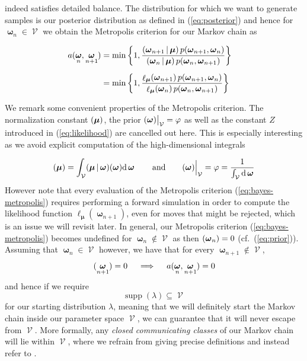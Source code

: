 \documentclass[10pt]{article}
\newcommand{\cf}{cf.~}
\let\Pr\relax
\DeclareMathOperator\Pr{\mathbb{P}}
\DeclareMathOperator\fp{\mathcal{V}}
\DeclareMathOperator\likeli{\ell}
\DeclareMathOperator\supp{\mathrm{supp}}
\DeclareMathOperator\bmu{\boldsymbol{\mu}}
\DeclareMathOperator\bomega{\boldsymbol{\omega}}
\begin{document}
indeed satisfies detailed balance.
The distribution for which we want to generate samples is our posterior distribution as defined in (\ref{eq:posterior}) 
and hence for $\bomega_n \in \fp$ we obtain the Metropolis criterion for our Markov chain as
\begin{align}
    \nonumber \\[-12pt] 
    a(\bomega_n,\bomega_{n+1}) 
	&= \min\bigg\{ 1, \frac{ 
	    \Pr(\bomega_{n+1}|\bmu) \, p(\bomega_{n+1}, \bomega_n) 
	}{ 
	    \Pr(\bomega_n|\bmu) \, p(\bomega_n, \bomega_{n+1}) 
	} \bigg\} 
	\nonumber \\[2mm]
	&= \min\bigg\{ 1, \frac{ 
	    \likeli_{\bmu}(\bomega_{n+1}) \, p(\bomega_{n+1}, \bomega_n) 
	}{ 
	    \likeli_{\bmu}(\bomega_n) \, p(\bomega_n, \bomega_{n+1}) 
	} \bigg\}
	\label{eq:bayes-metropolis}
    \\[-12pt] \nonumber
\end{align}
We remark some convenient properties of the Metropolis criterion.
The normalization constant $\Pr(\bmu)$, the prior $\Pr(\bomega)\big|_{\fp} = \varphi$ as well as the constant $Z$ 
introduced in (\ref{eq:likelihood}) are cancelled out here. 
This is especially interesting as we avoid explicit computation of the high-dimensional integrals
\begin{align}
    \nonumber \\[-12pt] 
    \Pr(\bmu) = \int_{\fp} \Pr(\bmu|\bomega)\Pr(\bomega)\dd\bomega
    \qquad \text{and} \qquad
    \Pr(\bomega) \Big|_{\fp} = \varphi = \frac{1}{\int_{\fp} \dd \bomega}
\end{align}
However note that every evaluation of the Metropolis criterion (\ref{eq:bayes-metropolis}) 
requires performing a forward simulation in order to compute the likelihood function 
$\likeli_{\bmu}(\bomega_{n+1})$, even for moves that might be rejected, which is an issue we 
will revisit later.
In general, our Metropolis criterion (\ref{eq:bayes-metropolis}) becomes undefined for $\bomega_n \notin \fp$ 
as then $\Pr(\bomega_n)=0$ (\cf (\ref{eq:prior})). 
Assuming that $\bomega_n \in \fp$ however, we have that for every $\bomega_{n+1} \notin \fp$, 
\[
    \Pr(\bomega_{n+1}) = 0 \quad \implies \quad a(\bomega_n, \bomega_{n+1}) = 0
\]
and hence if we require 
\[ 
    \supp(\lambda) \subseteq \fp 
\] 
for our starting distribution $\lambda$, meaning
that we will definitely start the Markov chain inside our parameter space $\fp$, 
we can guarantee that it will never escape from $\fp$.
More formally, any \emph{closed communicating classes} of our Markov chain will lie within $\fp$, where we refrain
from giving precise definitions and instead refer to \cite{norris97}.
\end{document}
